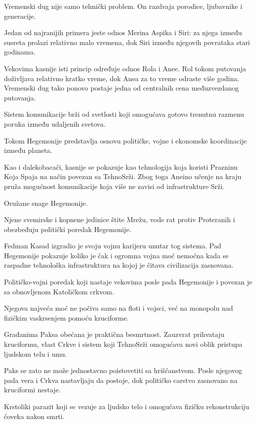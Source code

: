 \begin{description}
  Vremenski dug nije samo tehnički problem. On razdvaja porodice, ljubavnike i generacije.

  Jedan od najranijih primera jeste odnos Merina Aspika i Siri: za njega između susreta prolazi relativno malo vremena, dok Siri između njegovih povrataka stari godinama.

  Vekovima kasnije isti princip određuje odnos Rola i Anee. Rol tokom putovanja doživljava relativno kratko vreme, dok Anea za to vreme odraste više godina. Vremenski dug tako ponovo postaje jedna od centralnih cena međuzvezdanog putovanja.


  \item[Fetlinija]
  Sistem komunikacije brži od svetlosti koji omogućava gotovo trenutnu razmenu poruka između udaljenih svetova.

  Tokom Hegemonije predstavlja osnovu političke, vojne i ekonomske koordinacije između planeta.

  Kao i dalekobacači, kasnije se pokazuje kao tehnologija koja koristi Prazninu Koja Spaja na način povezan sa TehnoSrži. Zbog toga Aneino učenje na kraju pruža mogućnost komunikacije koja više ne zavisi od infrastrukture Srži.


  \item[SILA]
  Oružane snage Hegemonije.

  Njene svemirske i kopnene jedinice štite Mrežu, vode rat protiv Proteranih i obezbeđuju politički poredak Hegemonije.

  Fedman Kasad izgradio je svoju vojnu karijeru unutar tog sistema. Pad Hegemonije pokazuje koliko je čak i ogromna vojna moć nemoćna kada se raspadne tehnološka infrastruktura na kojoj je čitava civilizacija zasnovana.


  \item[Paks]
  Političko-vojni poredak koji nastaje vekovima posle pada Hegemonije i povezan je sa obnovljenom Katoličkom crkvom.

  Njegova najveća moć ne počiva samo na floti i vojsci, već na monopolu nad fizičkim vaskrsenjem pomoću kruciforme.

  Građanima Paksa obećana je praktična besmrtnost. Zauzvrat prihvataju kruciformu, vlast Crkve i sistem koji TehnoSrži omogućava novi oblik pristupa ljudskom telu i umu.

  Paks se zato ne može jednostavno poistovetiti sa hrišćanstvom. Posle njegovog pada vera i Crkva nastavljaju da postoje, dok političko carstvo zasnovano na kruciformi nestaje.


  \item[Kruciforma]
  Krstoliki parazit koji se vezuje za ljudsko telo i omogućava fizičku rekonstrukciju čoveka nakon smrti.


\end{description}
